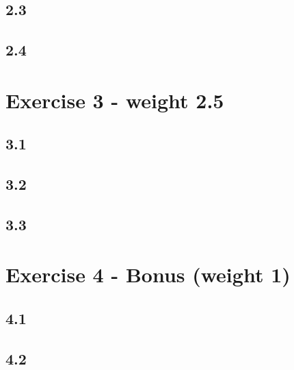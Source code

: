 \documentclass[a4paper]{article}
\begin{document}
\subsection*{2.3}




\subsection*{2.4}



\section*{Exercise 3 - weight 2.5}

\subsection*{3.1}




\subsection*{3.2}





\subsection*{3.3}




\section*{Exercise 4 - Bonus (weight 1)}



\subsection*{4.1}



\subsection*{4.2}
\end{document}
